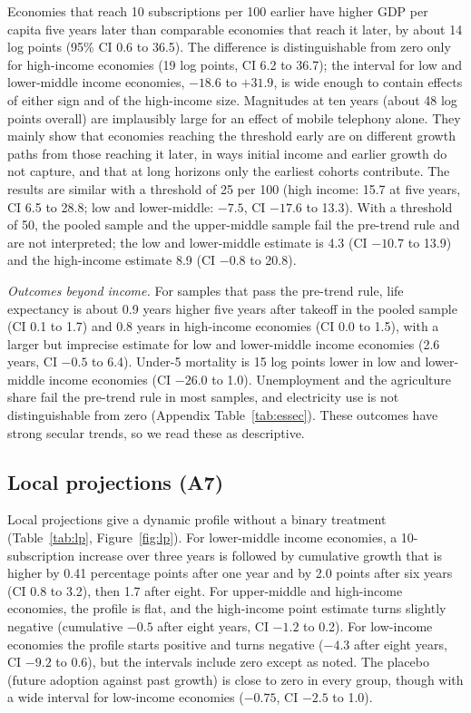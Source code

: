 Economies that reach 10 subscriptions per 100 earlier have higher GDP per capita five years later than comparable economies that reach it later, by about 14 log points (95\% CI 0.6 to 36.5). The difference is distinguishable from zero only for high-income economies (19 log points, CI 6.2 to 36.7); the interval for low and lower-middle income economies, $-18.6$ to $+31.9$, is wide enough to contain effects of either sign and of the high-income size. Magnitudes at ten years (about 48 log points overall) are implausibly large for an effect of mobile telephony alone. They mainly show that economies reaching the threshold early are on different growth paths from those reaching it later, in ways initial income and earlier growth do not capture, and that at long horizons only the earliest cohorts contribute. The results are similar with a threshold of 25 per 100 (high income: 15.7 at five years, CI 6.5 to 28.8; low and lower-middle: $-7.5$, CI $-17.6$ to 13.3). With a threshold of 50, the pooled sample and the upper-middle sample fail the pre-trend rule and are not interpreted; the low and lower-middle estimate is 4.3 (CI $-10.7$ to 13.9) and the high-income estimate 8.9 (CI $-0.8$ to 20.8).

\emph{Outcomes beyond income.} For samples that pass the pre-trend rule, life expectancy is about 0.9 years higher five years after takeoff in the pooled sample (CI 0.1 to 1.7) and 0.8 years in high-income economies (CI 0.0 to 1.5), with a larger but imprecise estimate for low and lower-middle income economies (2.6 years, CI $-0.5$ to 6.4). Under-5 mortality is 15 log points lower in low and lower-middle income economies (CI $-26.0$ to 1.0). Unemployment and the agriculture share fail the pre-trend rule in most samples, and electricity use is not distinguishable from zero (Appendix Table~\ref{tab:essec}). These outcomes have strong secular trends, so we read these as descriptive.

\subsection{Local projections (A7)}
Local projections give a dynamic profile without a binary treatment (Table~\ref{tab:lp}, Figure~\ref{fig:lp}). For lower-middle income economies, a 10-subscription increase over three years is followed by cumulative growth that is higher by 0.41 percentage points after one year and by 2.0 points after six years (CI 0.8 to 3.2), then 1.7 after eight. For upper-middle and high-income economies, the profile is flat, and the high-income point estimate turns slightly negative (cumulative $-0.5$ after eight years, CI $-1.2$ to 0.2). For low-income economies the profile starts positive and turns negative ($-4.3$ after eight years, CI $-9.2$ to 0.6), but the intervals include zero except as noted. The placebo (future adoption against past growth) is close to zero in every group, though with a wide interval for low-income economies ($-0.75$, CI $-2.5$ to 1.0).

